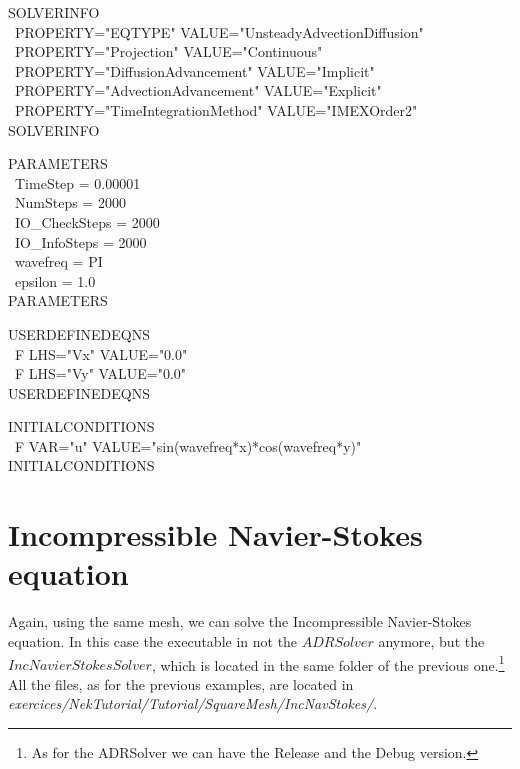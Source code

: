 \documentclass[12pt]{article}
\begin{document}
\vspace{5mm}
\begin{algorithm2e}[H]
SOLVERINFO\\\
        PROPERTY="EQTYPE" VALUE="UnsteadyAdvectionDiffusion" \\\
        PROPERTY="Projection" VALUE="Continuous"\\\
        PROPERTY="DiffusionAdvancement" VALUE="Implicit"\\\
        PROPERTY="AdvectionAdvancement" VALUE="Explicit"\\\
        PROPERTY="TimeIntegrationMethod" VALUE="IMEXOrder2"\\
SOLVERINFO\\
\end{algorithm2e}
\begin{algorithm2e}[H]
PARAMETERS\\\
      TimeStep      = 0.00001 \\\  
      NumSteps      = 2000\\\                
      IO\_CheckSteps = 2000\\\                 
      IO\_InfoSteps  = 2000\\\                 
      wavefreq = PI\\\                      
      epsilon = 1.0\\                       
 PARAMETERS\\
\end{algorithm2e}
\begin{algorithm2e}[H]
USERDEFINEDEQNS\\\
       F LHS="Vx" VALUE="0.0" \\\
       F LHS="Vy" VALUE="0.0"\\
USERDEFINEDEQNS\\
 \end{algorithm2e}
\begin{algorithm2e}[H]
 INITIALCONDITIONS\\\
        F VAR="u" VALUE="sin(wavefreq*x)*cos(wavefreq*y)" \\
    INITIALCONDITIONS\\
    \end{algorithm2e}
\vspace{5mm}

\section{Incompressible Navier-Stokes equation}

Again, using the same mesh, we can solve the Incompressible Navier-Stokes equation. In this case the executable in not the $ADRSolver$ anymore, but the $IncNavierStokesSolver$, which is located in the same folder of the previous one.\footnote{As for the ADRSolver we can have the Release and the Debug version.} All the files, as for the previous examples, are located in \emph{exercices/NekTutorial/Tutorial/SquareMesh/IncNavStokes/}.
\end{document}
